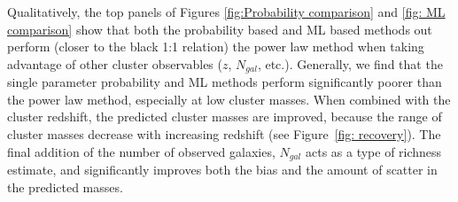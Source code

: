 \documentclass[fleqn,usenatbib]{mnras}
\begin{document}
Qualitatively, the top panels of Figures \ref{fig:Probability comparison} and \ref{fig: ML comparison} show that both the probability based and ML based methods out perform (closer to the black 1:1 relation) the power law method when taking advantage of other cluster observables ($z$, $N_{gal}$, etc.). Generally, we find that the single parameter probability and ML methods perform significantly poorer than the power law method, especially at low cluster masses. When combined with the cluster redshift, the predicted cluster masses are improved, because the range of cluster masses decrease with increasing redshift (see Figure~\ref{fig: recovery}). The final addition of the number of observed galaxies, $N_{gal}$ acts as a type of richness estimate, and significantly improves both the bias and the amount of scatter in the predicted masses.
\end{document}
